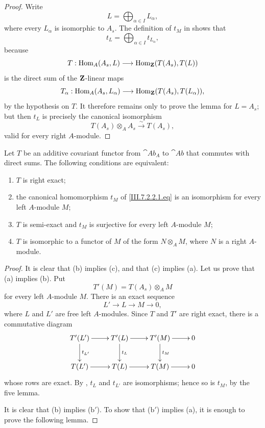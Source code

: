 \begin{proof}
Write
\[
  L=\bigoplus_{\alpha\in I}L_\alpha,
\]
where every $L_\alpha$ is isomorphic to $A_s$.  The definition
of $t_M$ in  shows that
\[
  t_L=\bigoplus_{\alpha\in I}t_{L_\alpha},
\]
because
\[
  T:
  \operatorname{Hom}_A(A_s,L)
  \longrightarrow
  \operatorname{Hom}_{\mathbf{Z}}(T(A_s),T(L))
\]
is the direct sum of the $\mathbf{Z}$-linear maps
\[
  T_\alpha:
  \operatorname{Hom}_A(A_s,L_\alpha)
  \longrightarrow
  \operatorname{Hom}_{\mathbf{Z}}(T(A_s),T(L_\alpha)),
\]
by the hypothesis on $T$.  It therefore remains only to prove
the lemma for $L=A_s$; but then $t_L$ is precisely the canonical
isomorphism
\[
  T(A_s)\otimes_A A_s
  \xrightarrow{\sim}
  T(A_s),
\]
valid for every right $A$-module.
\end{proof}

\begin{proposition}[7.2.5]
\label{III.7.2.5}
Let $T$ be an additive covariant functor from $\cat{Ab}_A$ to
$\cat{Ab}$ that commutes with direct sums.  The following
conditions are equivalent:
\begin{enumerate}
  \item[(a)] $T$ is right exact;
  \item[(b)] the canonical homomorphism $t_M$ of
    \eqref{III.7.2.2.1.eq} is an isomorphism for every left
    $A$-module $M$;
  \item[($\mathrm{b}'$)] $T$ is semi-exact and $t_M$ is
    surjective for every left $A$-module $M$;
  \item[(c)] $T$ is isomorphic to a functor of $M$ of the form
    $N\otimes_A M$, where $N$ is a right $A$-module.
\end{enumerate}
\end{proposition}

\begin{proof}
It is clear that (b) implies (c), and that (c) implies (a).
Let us prove that (a) implies (b).
Put
\[
  T'(M)=T(A_s)\otimes_A M
\]
for every left $A$-module $M$.  There is an exact sequence
\[
  L'\longrightarrow L\longrightarrow M\longrightarrow0,
\]
where $L$ and $L'$ are free left $A$-modules.  Since $T$ and
$T'$ are right exact, there is a commutative diagram
\[
\xymatrix{
  T'(L')\ar[r]\ar[d]^{t_{L'}}
  & T'(L)\ar[r]\ar[d]^{t_L}
  & T'(M)\ar[r]\ar[d]^{t_M}
  & 0
  \\
  T(L')\ar[r]
  & T(L)\ar[r]
  & T(M)\ar[r]
  & 0
}
\]
whose rows are exact.  By , $t_L$ and
$t_{L'}$ are isomorphisms; hence so is $t_M$, by the five
lemma.

It is clear that (b) implies ($\mathrm{b}'$).  To show that
($\mathrm{b}'$) implies (a), it is enough to prove the following
lemma.
\end{proof}

